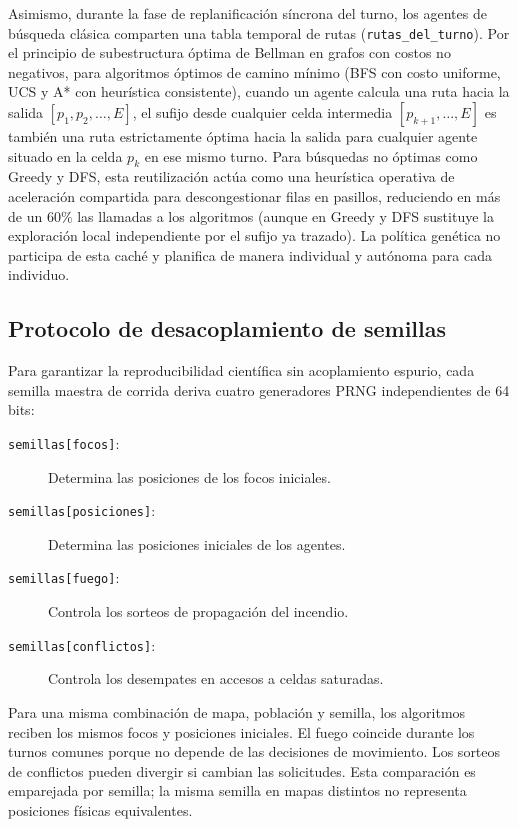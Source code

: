 \documentclass[11pt,letterpaper]{article}
\begin{document}
Asimismo, durante la fase de replanificación síncrona del turno, los agentes de búsqueda clásica comparten una tabla temporal de rutas (\texttt{rutas\_del\_turno}). Por el principio de subestructura óptima de Bellman en grafos con costos no negativos, para algoritmos óptimos de camino mínimo (BFS con costo uniforme, UCS y A* con heurística consistente), cuando un agente calcula una ruta hacia la salida $[p_1, p_2, \dots, E]$, el sufijo desde cualquier celda intermedia $[p_{k+1}, \dots, E]$ es también una ruta estrictamente óptima hacia la salida para cualquier agente situado en la celda $p_k$ en ese mismo turno. Para búsquedas no óptimas como Greedy y DFS, esta reutilización actúa como una heurística operativa de aceleración compartida para descongestionar filas en pasillos, reduciendo en más de un 60\% las llamadas a los algoritmos (aunque en Greedy y DFS sustituye la exploración local independiente por el sufijo ya trazado). La política genética no participa de esta caché y planifica de manera individual y autónoma para cada individuo.

\subsection{Protocolo de desacoplamiento de semillas}

Para garantizar la reproducibilidad científica sin acoplamiento espurio, cada semilla maestra de corrida deriva cuatro generadores PRNG independientes de 64 bits:

\begin{description}
    \item[\texttt{semillas[focos]}:] Determina las posiciones de los focos iniciales.
    \item[\texttt{semillas[posiciones]}:] Determina las posiciones iniciales de los agentes.
    \item[\texttt{semillas[fuego]}:] Controla los sorteos de propagación del incendio.
    \item[\texttt{semillas[conflictos]}:] Controla los desempates en accesos a celdas saturadas.
\end{description}

Para una misma combinación de mapa, población y semilla, los algoritmos reciben los mismos focos y posiciones iniciales. El fuego coincide durante los turnos comunes porque no depende de las decisiones de movimiento. Los sorteos de conflictos pueden divergir si cambian las solicitudes. Esta comparación es emparejada por semilla; la misma semilla en mapas distintos no representa posiciones físicas equivalentes.
\end{document}
